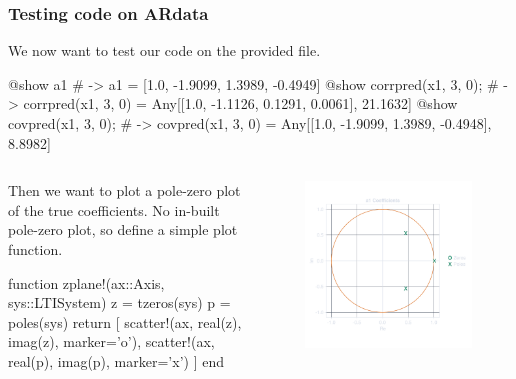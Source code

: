 \documentclass[compress,aspectratio=169]{beamer}
\begin{document}
\begin{frame}[fragile] %
    \frametitle{Testing code on ARdata}
    We now want to test our code on the provided  file.
    \begin{jllisting}[gobble=8]
        @show a1 # -> a1 = [1.0, -1.9099, 1.3989, -0.4949]
        @show corrpred(x1, 3, 0); # -> corrpred(x1, 3, 0) = Any[[1.0, -1.1126, 0.1291, 0.0061], 21.1632]
        @show covpred(x1, 3, 0); # -> covpred(x1, 3, 0) = Any[[1.0, -1.9099, 1.3989, -0.4948], 8.8982]
    \end{jllisting}
    \begin{columns}
        \begin{column}{0.53\textwidth}
            Then we want to plot a pole-zero plot of the  true coefficients. No
            in-built pole-zero plot, so define a simple plot function.
            \begin{jllisting}[gobble=16]
                function zplane!(ax::Axis, sys::LTISystem)
                    z = tzeros(sys)
                    p = poles(sys)
                    return [
                        scatter!(ax, real(z), imag(z), marker='o'),
                        scatter!(ax, real(p), imag(p), marker='x')
                    ]
                end
            \end{jllisting}
        \end{column}
        \begin{column}{0.47\textwidth}
            \begin{figure}
                \includegraphics[width=0.8\columnwidth]{"../1.pdf"}
            \end{figure}
        \end{column}
    \end{columns}
    
\end{frame}
\end{document}
